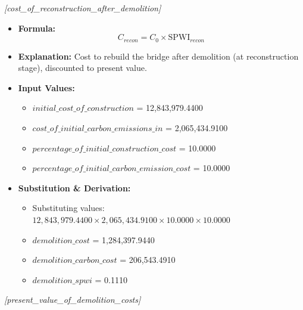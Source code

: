 \documentclass[12pt,a4paper]{article}
\begin{document}
\textit{[cost\_of\_reconstruction\_after\_demolition]}

\begin{itemize}
  \item \textbf{Formula:} $$C_{recon} = C_0 \times \text{SPWI}_{recon}$$
  \item \textbf{Explanation:} Cost to rebuild the bridge after demolition (at reconstruction stage), discounted to present value.
  \item \textbf{Input Values:}
  \begin{itemize}
    \item $initial\_cost\_of\_construction$ = 12,843,979.4400
    \item $cost\_of\_initial\_carbon\_emissions\_in$ = 2,065,434.9100
    \item $percentage\_of\_initial\_construction\_cost$ = 10.0000
    \item $percentage\_of\_initial\_carbon\_emission\_cost$ = 10.0000
  \end{itemize}
  \item \textbf{Substitution \& Derivation:}
  \begin{itemize}
    \item Substituting values: $12,843,979.4400 \times 2,065,434.9100 \times 10.0000 \times 10.0000$
    \item $demolition\_cost$ = 1,284,397.9440
    \item $demolition\_carbon\_cost$ = 206,543.4910
    \item $demolition\_spwi$ = 0.1110
  \end{itemize}
\end{itemize}


\textit{[present\_value\_of\_demolition\_costs]}
\end{document}
